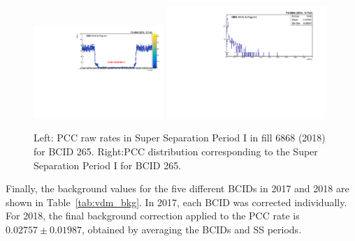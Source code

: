 \begin{figure}[h]
    \centering
    \includegraphics[width=0.44\textwidth,height=0.30\textwidth]{figures/performance_PCC/PCC_Rates_SS1.pdf}
    \includegraphics[width=0.54\textwidth,height=0.30\textwidth]{figures/performance_PCC/PCC_Projection_SS1.pdf}
    \caption[Background in BCID 265 during SS1 (2018)]{Left: PCC raw rates in Super Separation Period I in fill 6868 (2018) for BCID 265. 
    Right:PCC distribution corresponding to the Super Separation Period I for BCID 265.}
    \label{fig:bx_265}
\end{figure}

Finally, the background values for the five different BCIDs in 2017 and 2018 are shown in Table~\ref{tab:vdm_bkg}. In 2017, each BCID was corrected individually. For 2018, the final background correction applied to the PCC rate is $0.02757 \pm 0.01987$, obtained by averaging the BCIDs and SS periods.


